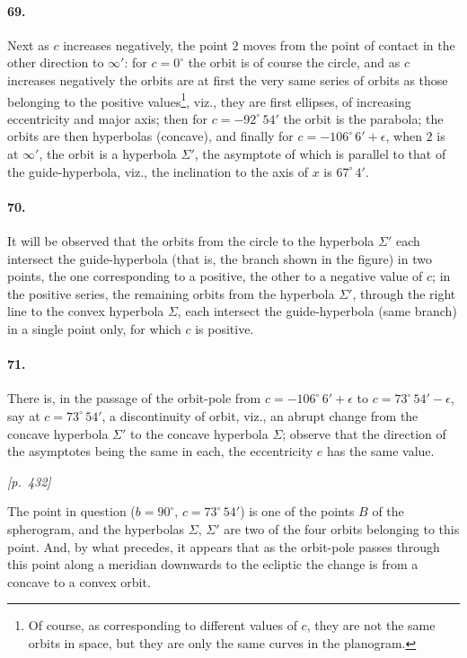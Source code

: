 \documentclass[11pt]{article}
\begin{document}
\paragraph{69.} Next as $c$ increases negatively, the point $2$ moves from the point of contact in the other direction to $\infty'$: for $c=0^{\circ}$ the orbit is of course the circle, and as $c$ increases negatively the orbits are at first the very same series of orbits as those belonging to the positive values\footnote{Of course, as corresponding to different values of $c$, they are not the same orbits in space, but they are only the same curves in the planogram.}, viz., they are first ellipses, of increasing eccentricity and major axis; then for $c=-92^{\circ}\,54'$ the orbit is the parabola; the orbits are then hyperbolas (concave), and finally for $c=-106^{\circ}\,6'+\epsilon$, when $2$ is at $\infty'$, the orbit is a hyperbola $\Sigma'$, the asymptote of which is parallel to that of the guide-hyperbola, viz., the inclination to the axis of $x$ is $67^{\circ}\,4'$.

\paragraph{70.} It will be observed that the orbits from the circle to the hyperbola $\Sigma'$ each intersect the guide-hyperbola (that is, the branch shown in the figure) in two points, the one corresponding to a positive, the other to a negative value of $c$; in the positive series, the remaining orbits from the hyperbola $\Sigma'$, through the right line to the convex hyperbola $\Sigma$, each intersect the guide-hyperbola (same branch) in a single point only, for which $c$ is positive.

\paragraph{71.} There is, in the passage of the orbit-pole from $c=-106^{\circ}\,6'+\epsilon$ to $c=73^{\circ}\,54'-\epsilon$, say at $c=73^{\circ}\,54'$, a discontinuity of orbit, viz., an abrupt change from the concave hyperbola $\Sigma'$ to the concave hyperbola $\Sigma$; observe that the direction of the asymptotes being the same in each, the eccentricity $e$ has the same value.

\medskip
\noindent\textit{[p.~432]}

\medskip

The point in question ($b=90^{\circ}$, $c=73^{\circ}\,54'$) is one of the points $B$ of the spherogram, and the hyperbolas $\Sigma,\, \Sigma'$ are two of the four orbits belonging to this point. And, by what precedes, it appears that as the orbit-pole passes through this point along a meridian downwards to the ecliptic the change is from a concave to a convex orbit.
\end{document}
